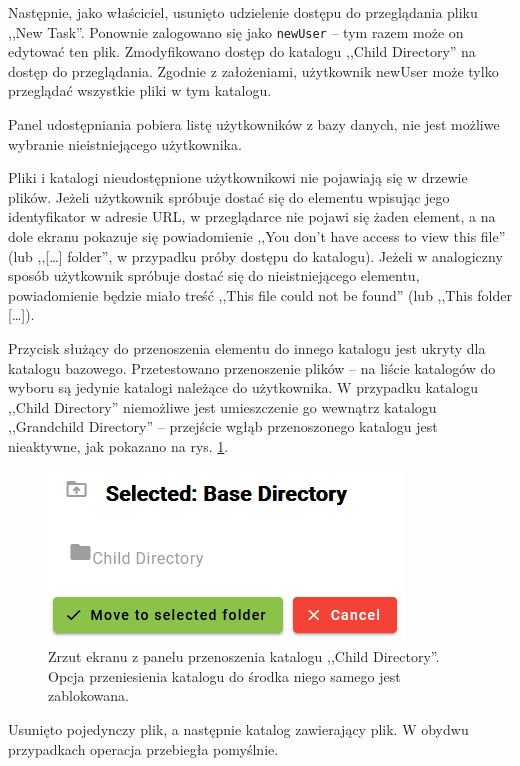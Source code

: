 \documentclass[a4paper,twoside,12pt]{book}
\begin{document}
Następnie, jako właściciel, usunięto udzielenie dostępu do przeglądania pliku ,,New Task''. Ponownie zalogowano się jako \texttt{newUser} -- tym razem może on edytować ten plik. Zmodyfikowano dostęp do katalogu ,,Child Directory'' na dostęp do przeglądania. Zgodnie z założeniami, użytkownik newUser może tylko przeglądać wszystkie pliki w tym katalogu.

Panel udostępniania pobiera listę użytkowników z bazy danych, nie jest możliwe wybranie nieistniejącego użytkownika. 

Pliki i katalogi nieudostępnione użytkownikowi nie pojawiają się w drzewie plików. Jeżeli użytkownik spróbuje dostać się do elementu wpisując jego identyfikator w adresie URL, w przeglądarce nie pojawi się żaden element, a na dole ekranu pokazuje się powiadomienie ,,You don't have access to view this file'' (lub ,,[\ldots] folder'', w przypadku próby dostępu do katalogu). Jeżeli w analogiczny sposób użytkownik spróbuje dostać się do nieistniejącego elementu, powiadomienie będzie miało treść ,,This file could not be found'' (lub ,,This folder [\ldots]).

Przycisk służący do przenoszenia elementu do innego katalogu jest ukryty dla katalogu bazowego. Przetestowano przenoszenie plików -- na liście katalogów do wyboru są jedynie katalogi należące do użytkownika. W przypadku katalogu ,,Child Directory'' niemożliwe jest umieszczenie go wewnątrz katalogu ,,Grandchild Directory'' -- przejście wgłąb przenoszonego katalogu jest nieaktywne, jak pokazano na rys. \ref{fig:move-dir-inactive}.

\begin{figure}
\centering
\includegraphics{./MoveDirInactive.png}
\caption{Zrzut ekranu z panelu przenoszenia katalogu ,,Child Directory''. Opcja przeniesienia katalogu do środka niego samego jest zablokowana.}
\label{fig:move-dir-inactive}
\end{figure}

Usunięto pojedynczy plik, a następnie katalog zawierający plik. W obydwu przypadkach operacja przebiegła pomyślnie.
\end{document}
